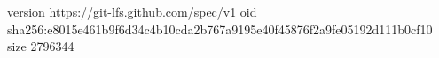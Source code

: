 version https://git-lfs.github.com/spec/v1
oid sha256:e8015e461b9f6d34c4b10cda2b767a9195e40f45876f2a9fe05192d111b0cf10
size 2796344
